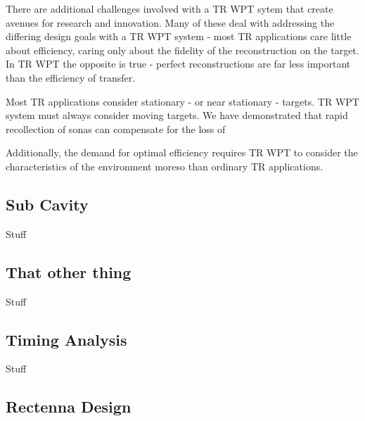 There are additional challenges involved with a TR WPT sytem that create avenues for research and innovation. Many of these deal with addressing the differing design goals with a TR WPT system - most TR applications care little about efficiency, caring only about the fidelity of the reconstruction on the target. In TR WPT the opposite is true - perfect reconstructions are far less important than the efficiency of transfer.

Most TR applications consider stationary - or near stationary - targets. TR WPT system must always consider moving targets. We have demonstrated that rapid recollection of sonas can compensate for the loss of 

Additionally, the demand for optimal efficiency requires TR WPT to consider the characteristics of the environment moreso than ordinary TR applications.

\subsection{Sub Cavity}

Stuff

\subsection{That other thing}

Stuff

\subsection{Timing Analysis}

Stuff

\subsection{Rectenna Design}
